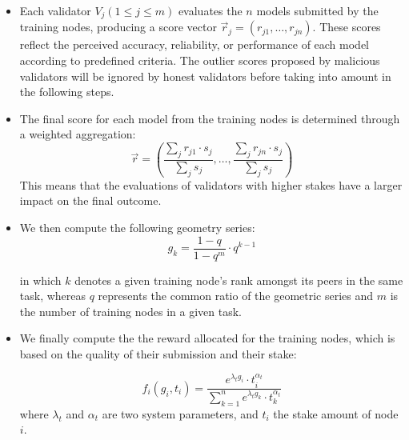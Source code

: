 \documentclass[conference]{IEEEtran}
\begin{document}
\begin{itemize}

    \item Each validator $V_j (1\leq j\leq m)$ evaluates the $n$ models submitted by the training nodes, producing a score vector $\vec{r}_j = (r_{j1}, \ldots, r_{jn})$. These scores reflect the perceived accuracy, reliability, or performance of each model according to predefined criteria. The outlier scores proposed by malicious validators will be ignored by honest validators  before taking into amount in the following steps.
    
    \item The final score for each model from the training nodes is determined through a weighted aggregation:
    \[
    \vec{r} = \left(\frac{\sum_{j}{r_{j1}\cdot s_j}}{\sum_{j}{s_j}}, \ldots, \frac{\sum_{j}{r_{jn}\cdot s_j}}{\sum_{j}{s_j}}\right)
    \]
    This means that the evaluations of validators with higher stakes have a larger impact on the final outcome.
    
    \item We then compute the following geometry series:
    \[
    g_k =  \frac{1 - q}{1 - q^m} \cdot q^{k-1}
    \]
    
in which $k$ denotes a given training node's rank amongst its peers in the same task, whereas $q$ represents the common ratio of the geometric series and $m$ is the number of training nodes in a given task.

\item We finally compute the the reward allocated for the training nodes, which is based on the quality of their submission and their stake:

$$f_i(g_i, t_i) = \frac{e^{\lambda_t g_{i}} \cdot t_i^{\alpha_t}}{\sum_{k=1}^{n} e^{\lambda_t g_{k}} \cdot t_k^{\alpha_t}}
$$
where $\lambda_t$ and $\alpha_t$ are two system parameters, and $t_i$ the stake amount of node $i$.

\end{itemize}
\end{document}
